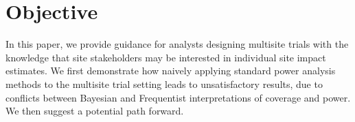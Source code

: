 \documentclass[]{article}
\begin{document}
\section{Objective}

In this paper, we provide guidance for analysts designing multisite trials with the knowledge that site stakeholders may be interested in individual site impact estimates.
We first demonstrate how naively applying standard power analysis methods to the multisite trial setting leads to unsatisfactory results, due to conflicts between Bayesian and Frequentist interpretations of coverage and power.
We then suggest a potential path forward.







\end{document}
